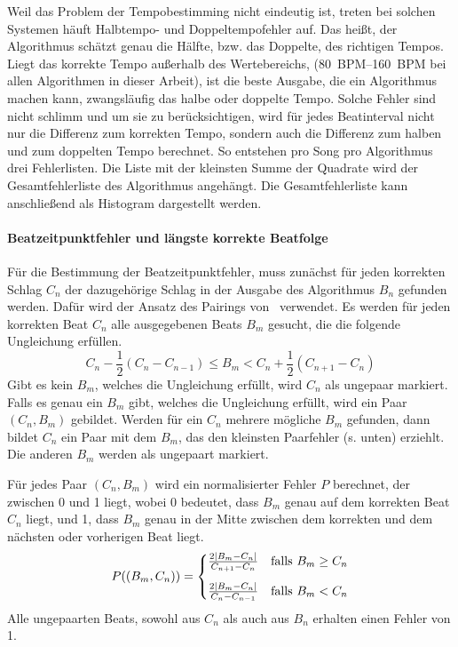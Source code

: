 {{{			%
			Weil das Problem der Tempobestimming nicht eindeutig ist,
				treten bei solchen Systemen häuft Halbtempo- und Doppeltempofehler auf.
			Das heißt,
				der Algorithmus schätzt genau die Hälfte, bzw. das Doppelte, des richtigen Tempos.
			Liegt das korrekte Tempo außerhalb des Wertebereichs,
				(\SIrange{80}{160}{BPM} bei allen Algorithmen in dieser Arbeit),
				ist die beste Ausgabe,
				die ein Algorithmus machen kann,
				zwangsläufig das halbe oder doppelte Tempo.
			Solche Fehler sind nicht schlimm
				und um sie zu berücksichtigen,
				wird für jedes Beatinterval nicht nur die Differenz zum korrekten Tempo,
				sondern auch die Differenz zum halben und zum doppelten Tempo berechnet.
			So entstehen pro Song pro Algorithmus drei Fehlerlisten.
			Die Liste mit der kleinsten Summe der Quadrate wird der Gesamtfehlerliste des Algorithmus angehängt.
			Die Gesamtfehlerliste kann anschließend als Histogram dargestellt werden.
		}

		\paragraph{Beatzeitpunktfehler und längste korrekte Beatfolge}
		{
			Für die Bestimmung der Beatzeitpunktfehler,
				muss zunächst für jeden korrekten Schlag $C_n$ der dazugehörige Schlag in der Ausgabe des Algorithmus $B_n$ gefunden werden.
			Dafür wird der Ansatz des Pairings von~\cite{1997_GoMu1} verwendet.
			Es werden für jeden korrekten Beat $C_n$ alle ausgegebenen Beats $B_m$ gesucht,
				die die folgende Ungleichung erfüllen.
			\begin{equation}
				C_n - \frac{1}{2}(C_n - C_{n - 1}) \le B_m < C_n + \frac{1}{2}(C_{n + 1} - C_n)
			\end{equation}
			Gibt es kein $B_m$,
				welches die Ungleichung erfüllt,
				wird $C_n$ als ungepaar markiert.
			Falls es genau ein $B_m$ gibt,
				welches die Ungleichung erfüllt,
				wird ein Paar $(C_n, B_m)$ gebildet.
			Werden für ein $C_n$ mehrere mögliche $B_m$ gefunden,
				dann bildet $C_n$ ein Paar mit dem $B_m$,
				das den kleinsten Paarfehler (s. unten) erziehlt.
			Die anderen $B_m$ werden als ungepaart markiert.

			Für jedes Paar $(C_n, B_m)$ wird ein normalisierter Fehler $P$ berechnet,
				der zwischen \num{0} und \num{1} liegt,
				wobei \num{0} bedeutet,
				dass $B_m$ genau auf dem korrekten Beat $C_n$ liegt,
				und \num{1},
				dass $B_m$ genau in der Mitte zwischen dem korrekten und dem nächsten oder vorherigen Beat liegt.
			\begin{equation}
				P((B_m, C_n)) =
					\begin{cases}
						\frac{2|B_m - C_n|}{C_{n + 1} - C_n} & \text{falls } B_m \ge C_n \vspace{3mm} \\
						\frac{2|B_m - C_n|}{C_n - C_{n - 1}} & \text{falls } B_m  <  C_n
					\end{cases}
			\end{equation}
			Alle ungepaarten Beats,
				sowohl aus $C_n$ als auch aus $B_n$ erhalten einen Fehler von \num{1}.

}}}
